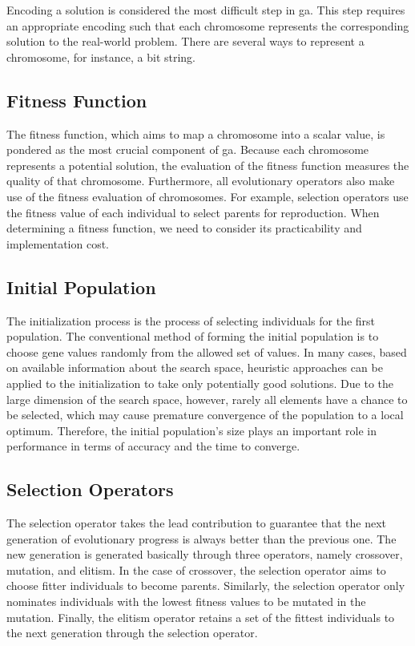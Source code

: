 Encoding a solution is considered the most difficult step in \gls{ga}. This step requires an appropriate encoding such that each chromosome represents the corresponding solution to the real-world problem. There are several ways to represent a chromosome, for instance, a bit string.

\subsection {Fitness Function}
\label{ga:fitness}
The fitness function, which aims to map a chromosome into a scalar value, is pondered as the most crucial component of \gls{ga}. Because each chromosome represents a potential solution, the evaluation of the fitness function measures the quality of that chromosome. Furthermore, all evolutionary operators also make use of the fitness evaluation of chromosomes. For example, selection operators use the fitness value of each individual to select parents for reproduction. When determining a fitness function, we need to consider its practicability and implementation cost.

\subsection {Initial Population}
\label{ga:init}
The initialization process is the process of selecting individuals for the first population. The conventional method of forming the initial population is to choose gene values randomly from the allowed set of values. In many cases, based on available information about the search space, heuristic approaches can be applied to the initialization to take only potentially good solutions. Due to the large dimension of the search space, however, rarely all elements have a chance to be selected, which may cause premature convergence of the population to a local optimum. Therefore, the initial population's size plays an important role in performance in terms of accuracy and the time to converge.

\subsection {Selection Operators}
\label{ga:selection}
The selection operator takes the lead contribution to guarantee that the next generation of evolutionary progress is always better than the previous one. The new generation is generated basically through three operators, namely crossover, mutation, and elitism. In the case of crossover, the selection operator aims to choose fitter individuals to become parents. Similarly, the selection operator only nominates individuals with the lowest fitness values to be mutated in the mutation. Finally, the elitism operator retains a set of the fittest individuals to the next generation through the selection operator. 

